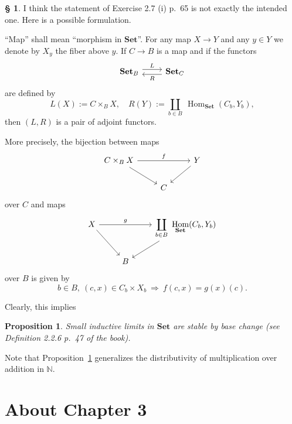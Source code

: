 \documentclass[12pt]{article}
\newtheorem{prop}[thm]{Proposition}
\theoremstyle{remark}
\theoremstyle{definition}
\newtheorem{s}[thm]{\S}
\newcommand{\bb}{\mathbb}
\newcommand{\Set}{\mathbf{Set}}
\newcommand{\then}{\Rightarrow}
\DeclareMathOperator{\Hom}{Hom}%
\begin{document}
%
\begin{s}\label{bc}
I think the statement of Exercise 2.7 (i) p.~65 is not exactly the intended one. Here is a possible formulation.

``Map'' shall mean ``morphism in $\Set$''. For any map $X\to Y$ and any $y\in Y$ we denote by $X_y$ the fiber above $y$. If $C\to B$ is a map and if the functors 
$$
\begin{tikzcd}
\Set_B\ar[yshift=.7ex]{r}{L}&\Set_C\ar[yshift=-.7ex]{l}{R}
\end{tikzcd}
$$ 
are defined by 
$$
L(X):=C\times_BX,\quad R(Y):=\coprod_{b\in B}\ \Hom_{\Set}(C_b,Y_b),
$$ 
then $(L,R)$ is a pair of adjoint functors.

More precisely, the bijection between maps
$$
\begin{tikzcd}
C\times_BX\ar{dr}\ar{rr}{f}&&Y\ar{dl}\\ 
{}&C
\end{tikzcd}
$$
over $C$ and maps
$$
\begin{tikzcd}
X\ar{dr}\ar{rr}{g}&&\displaystyle\coprod_{b\in B}\ \Hom_{\Set}(C_b,Y_b)\ar{dl}\\ 
{}&B
\end{tikzcd}
$$
over $B$ is given by 
$$
b\in B,\ (c,x)\in C_b\times X_b\ \then\ f(c,x)=g(x)(c).
$$

Clearly, this implies
%
\begin{prop}\label{sbc}
Small inductive limits in $\Set$ are stable by base change (see Definition 2.2.6 p.~47 of the book).
\end{prop}
%
Note that Proposition~\ref{sbc} generalizes the distributivity of multiplication over addition in $\bb N$.
\end{s}
%
%
\section{About Chapter 3}
%
\end{document}
